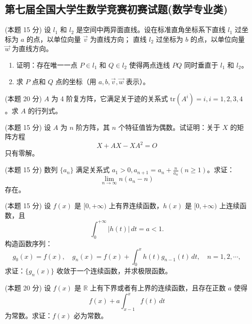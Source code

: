 \documentclass[loose]{ExBook}
\begin{document}
\subsection{第七届全国大学生数学竞赛初赛试题(数学专业类)}
\begin{qitems}
    \begin{bbox}
        \qitem (本题 15 分) 设 \( l_1 \) 和 \( l_2 \) 是空间中两异面直线。设在标准直角坐标系下直线 \( l_1 \) 过坐标为 \( {a} \) 的点，以单位向量 \( \vec{v} \) 为直线方向；
        直线 \( l_2 \) 过坐标为 \( {b} \) 的点，以单位向量 \( \vec{w} \) 为直线方向。
        
        \begin{enumerate}[label=(\arabic*)]
            \item 证明：存在唯一一点 \( P \in l_1 \) 和 \( Q \in l_2 \) 使得两点连线 \( PQ \) 同时垂直于 \( l_1 \) 和 \( l_2 \)。
            \item 求 \( P \) 点和 \( Q \) 点的坐标（用 \( {a}, {b}, \vec{v}, \vec{w} \) 表示）。
        \end{enumerate}
    \end{bbox}

    \begin{bbox}
        \qitem (本题 20 分) \( A \) 为 4 阶复方阵，它满足关于迹的关系式 \( \mathrm{tr}(A^i) = i, i = 1, 2, 3, 4 \)。求 \( A \) 的行列式。
    \end{bbox}

    \begin{bbox}
        \qitem (本题 15 分) 设 \( A \) 为 \( n \) 阶方阵，其 \( n \) 个特征值皆为偶数。试证明：关于 \( X \) 的矩阵方程
        \[X + AX - XA^2 = O\]
        只有零解。
    \end{bbox}

    \begin{bbox}
        \qitem (本题 15 分) 数列 \(\{a_n\}\) 满足关系式 \( a_1 > 0, a_{n+1} = a_n + \frac{n}{a_n} (n \geq 1) \)。求证：
        \[
        \lim\limits_{n \to \infty} n(a_n - n)
        \]
        存在。
    \end{bbox}

    \begin{bbox}
        \qitem (本题 15 分) 设 \( f(x) \) 是 \([0, +\infty)\) 上有界连续函数，\( h(x) \) 是 \([0, +\infty)\) 上连续函数，且
        \[
        \int_0^{+\infty} |h(t)| \, dt = a < 1.
        \]
        构造函数序列：
        \[
        g_0(x) = f(x), \quad g_n(x) = f(x) + \int_0^x h(t)g_{n-1}(t) \, dt, \quad n = 1, 2, \cdots,
        \]
        求证：\(\{g_n(x)\}\) 收敛于一个连续函数，并求极限函数。
    \end{bbox}

    \begin{bbox}
        \qitem (本题 20 分) 设 \( f(x) \) 是 \( \mathbb{R} \) 上有下界或者有上界的连续函数，且存在正数 \( a \) 使得
        \[
        f(x) + a \int_{x-1}^x f(t) \, dt
        \]
        为常数。求证：\( f(x) \) 必为常数。
    \end{bbox}
\end{qitems}
\end{document}
